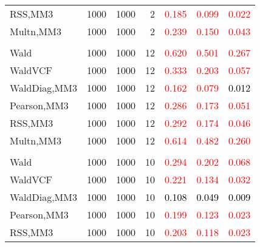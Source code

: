 \documentclass[
]{article}
\begin{document}
\begin{table}[H]
{\begin{tabular}[t]{lrrrrrr}
\hspace{1em}RSS,MM3 & 1000 & 1000 & 2 & \textcolor{red}{0.185} & \textcolor{red}{0.099} & \textcolor{red}{0.022}\\
\hspace{1em}Multn,MM3 & 1000 & 1000 & 2 & \textcolor{red}{0.239} & \textcolor{red}{0.150} & \textcolor{red}{0.043}\\
\addlinespace[0.3em]
\multicolumn{7}{l}{\textbf{1F 15V}}\\
\hspace{1em}Wald & 1000 & 1000 & 12 & \textcolor{red}{0.620} & \textcolor{red}{0.501} & \textcolor{red}{0.267}\\
\hspace{1em}WaldVCF & 1000 & 1000 & 12 & \textcolor{red}{0.333} & \textcolor{red}{0.203} & \textcolor{red}{0.057}\\
\hspace{1em}WaldDiag,MM3 & 1000 & 1000 & 12 & \textcolor{red}{0.162} & \textcolor{red}{0.079} & \textcolor{black}{0.012}\\
\hspace{1em}Pearson,MM3 & 1000 & 1000 & 12 & \textcolor{red}{0.286} & \textcolor{red}{0.173} & \textcolor{red}{0.051}\\
\hspace{1em}RSS,MM3 & 1000 & 1000 & 12 & \textcolor{red}{0.292} & \textcolor{red}{0.174} & \textcolor{red}{0.046}\\
\hspace{1em}Multn,MM3 & 1000 & 1000 & 12 & \textcolor{red}{0.614} & \textcolor{red}{0.482} & \textcolor{red}{0.260}\\
\addlinespace[0.3em]
\multicolumn{7}{l}{\textbf{2F 10V}}\\
\hspace{1em}Wald & 1000 & 1000 & 10 & \textcolor{red}{0.294} & \textcolor{red}{0.202} & \textcolor{red}{0.068}\\
\hspace{1em}WaldVCF & 1000 & 1000 & 10 & \textcolor{red}{0.221} & \textcolor{red}{0.134} & \textcolor{red}{0.032}\\
\hspace{1em}WaldDiag,MM3 & 1000 & 1000 & 10 & \textcolor{black}{0.108} & \textcolor{black}{0.049} & \textcolor{black}{0.009}\\
\hspace{1em}Pearson,MM3 & 1000 & 1000 & 10 & \textcolor{red}{0.199} & \textcolor{red}{0.123} & \textcolor{red}{0.023}\\
\hspace{1em}RSS,MM3 & 1000 & 1000 & 10 & \textcolor{red}{0.203} & \textcolor{red}{0.118} & \textcolor{red}{0.023}\\

\end{tabular}}
\end{table}
\end{document}
